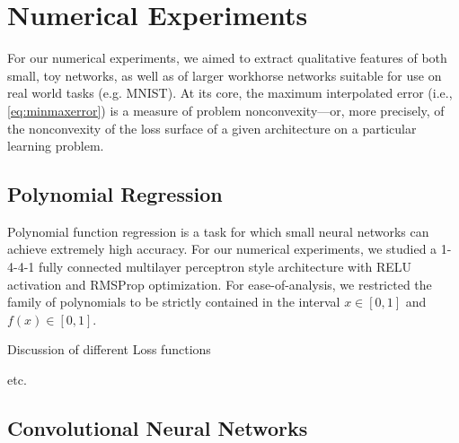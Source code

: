 \section{Numerical Experiments}
\label{sec:NumExp}

For our numerical experiments, we aimed to extract qualitative features of both small, toy networks, as well as of larger workhorse networks suitable for use on real world tasks (e.g. MNIST).  At its core, the maximum interpolated error (i.e., \eqref{eq:minmaxerror}) is a measure of problem nonconvexity---or, more precisely, of the nonconvexity of the loss surface of a given architecture on a particular learning problem.


\subsection{Polynomial Regression}
\label{sec:PolyFuncs}

 Polynomial function regression is a task for which small neural networks can achieve extremely high accuracy.  For our numerical experiments, we studied a 1-4-4-1 fully connected multilayer perceptron style architecture with RELU activation and RMSProp optimization.  For ease-of-analysis, we restricted the family of polynomials to be strictly contained in the interval $x\in[0,1]$ and $f(x)\in[0,1]$.
 
 Discussion of different Loss functions
 
 etc.


\subsection{Convolutional Neural Networks}
\label{sec:CNN}



